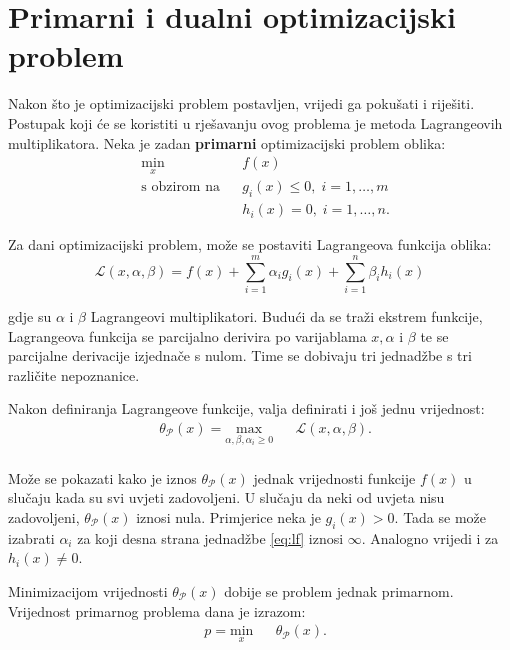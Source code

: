 \documentclass[times, utf8, zavrsni, numeric]{fer}
\begin{document}
\section{Primarni i dualni optimizacijski problem}
Nakon što je optimizacijski problem postavljen, vrijedi ga pokušati i riješiti.
Postupak koji će se koristiti u rješavanju ovog problema je metoda Lagrangeovih multiplikatora.
Neka je zadan \textbf{primarni} optimizacijski problem oblika:
\begin{equation}
\begin{aligned}
& \underset{x}{\text{min}}
& & f(x)\\
& \text{s obzirom na}
& & g_i(x) \leq 0, \; i = 1, \ldots, m \\
&&& h_i(x) = 0, \; i = 1, \ldots, n.
\end{aligned}
\label{eq:lf}
\end{equation}

Za dani optimizacijski problem, može se postaviti Lagrangeova funkcija oblika:
\begin{equation}
\mathcal{L}(x, \alpha, \beta) = f(x) + \sum_{i=1}^{m}\alpha_ig_i(x) + \sum_{i=1}^{n}\beta_ih_i(x)
\end{equation}

gdje su $\alpha$ i $\beta$ Lagrangeovi multiplikatori.
Budući da se traži ekstrem funkcije, Lagrangeova funkcija se parcijalno derivira po varijablama $x, \alpha$
i $\beta$ te se parcijalne derivacije izjednače s nulom. 
Time se dobivaju tri jednadžbe s tri različite nepoznanice.

\par Nakon definiranja Lagrangeove funkcije, valja definirati i još jednu vrijednost:
\begin{equation}
\begin{aligned}
& \theta_\mathcal{P}(x) = \underset{\alpha, \beta, \alpha_i \geq 0}{\text{max}}
& & \mathcal{L}(x, \alpha, \beta).\\
\end{aligned}
\end{equation}

Može se pokazati kako je iznos $\theta_\mathcal{P}(x)$ jednak vrijednosti funkcije $f(x)$ u slučaju kada su svi uvjeti
zadovoljeni. 
U slučaju da neki od uvjeta nisu zadovoljeni, $\theta_\mathcal{P}(x)$ iznosi nula.
Primjerice neka je $g_i(x) > 0$.
Tada se može izabrati $\alpha_i$ za koji desna strana jednadžbe \ref{eq:lf} iznosi $\infty$.
Analogno vrijedi i za $h_i(x) \neq 0$. 
\par Minimizacijom vrijednosti $\theta_\mathcal{P}(x)$ dobije se problem jednak primarnom.
Vrijednost primarnog problema dana je izrazom:
\begin{equation}
\begin{aligned}
& p = \underset{x}{\text{min}}
& & \theta_\mathcal{P}(x).\\
\end{aligned}
\end{equation}
\end{document}
